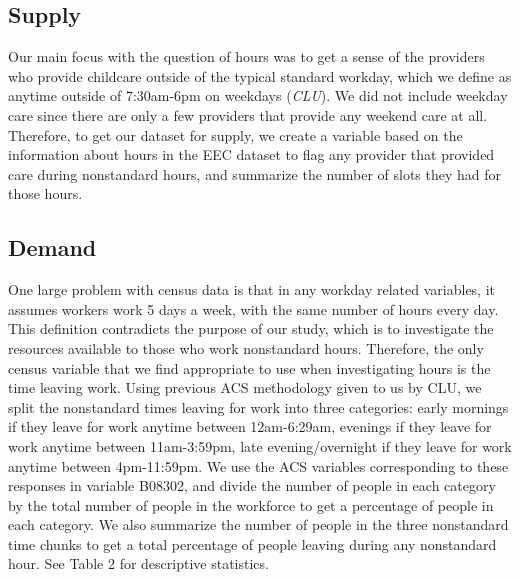 \documentclass[10pt,letterpaper]{article}
\begin{document}
\subsection{Supply}\label{supply-1}

Our main focus with the question of hours was to get a sense of the
providers who provide childcare outside of the typical standard workday,
which we define as anytime outside of 7:30am-6pm on weekdays
(\emph{CLU}). We did not include weekday care since there are only a few
providers that provide any weekend care at all. Therefore, to get our
dataset for supply, we create a variable based on the information about
hours in the EEC dataset to flag any provider that provided care during
nonstandard hours, and summarize the number of slots they had for those
hours.

\subsection{Demand}\label{demand-1}

One large problem with census data is that in any workday related
variables, it assumes workers work 5 days a week, with the same number
of hours every day. This definition contradicts the purpose of our
study, which is to investigate the resources available to those who work
nonstandard hours. Therefore, the only census variable that we find
appropriate to use when investigating hours is the time leaving work.
Using previous ACS methodology given to us by CLU, we split the
nonstandard times leaving for work into three categories: early mornings
if they leave for work anytime between 12am-6:29am, evenings if they
leave for work anytime between 11am-3:59pm, late evening/overnight if
they leave for work anytime between 4pm-11:59pm. We use the ACS
variables corresponding to these responses in variable B08302, and
divide the number of people in each category by the total number of
people in the workforce to get a percentage of people in each category.
We also summarize the number of people in the three nonstandard time
chunks to get a total percentage of people leaving during any
nonstandard hour. See Table 2 for descriptive statistics.
\end{document}
